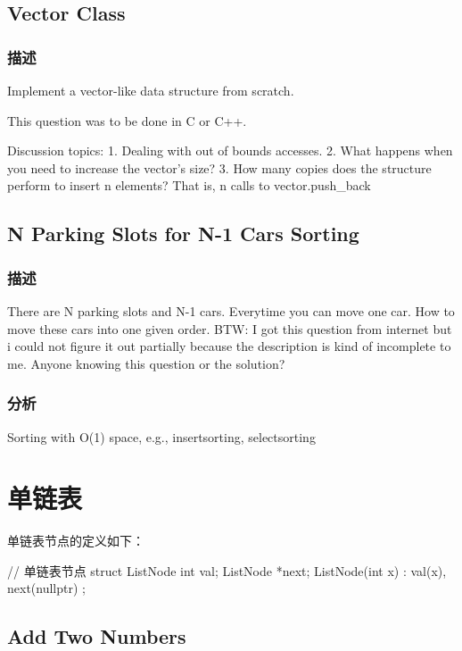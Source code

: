 \subsection{Vector Class}
\subsubsection{描述}
Implement a vector-like data structure from scratch. 

This question was to be done in C or C++. 

Discussion topics: 
1. Dealing with out of bounds accesses. 
2. What happens when you need to increase the vector's size? 
3. How many copies does the structure perform to insert n elements? That is, n 
calls to vector.push_back

\subsection{N Parking Slots for N-1 Cars Sorting}
\subsubsection{描述}
There are N parking slots and N-1 cars. Everytime you can move one car. How to move these cars into one given order. 
BTW: I got this question from internet but i could not figure it out partially because the description is kind of incomplete to me. Anyone knowing this question or the solution?
\subsubsection{分析}
Sorting with O(1) space, e.g., insertsorting, selectsorting



\section{单链表} %

单链表节点的定义如下：
\begin{Code}
	// 单链表节点
	struct ListNode {
		int val;
		ListNode *next;
		ListNode(int x) : val(x), next(nullptr) { }
	};
\end{Code}


\subsection{Add Two Numbers}
\label{sec:add-two-numbers}


